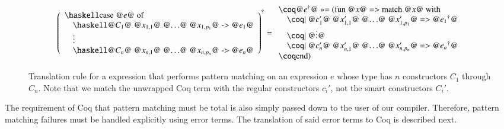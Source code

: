 \begin{figure}[H]
  \[
    \toCoq{\left(
      \begin{array}{l}
        \haskellM{case @$e$@ of}                                                \\
        \quad\haskellM{@$C_1$@ @$x_{1,1}$@ @$\ldots$@ @$x_{1,p_1}$@ -> @$e_1$@} \\
        \quad\vdots                                                             \\
        \quad\haskellM{@$C_n$@ @$x_{n,1}$@ @$\ldots$@ @$x_{n,p_n}$@ -> @$e_n$@}
      \end{array}
    \right)}
    = \begin{array}{l}
      \coqM{@$\toCoqX{e}$@ >>= (fun @$x$@ => match @$x$@ with}                          \\
      \quad\coqM{| @$c_1'$@ @$x_{1,1}'$@ @$\ldots$@ @$x_{1,p_1}'$@ => @$\toCoqX{e_1}$@} \\
      \quad\coqM{| @$\vdots$@}                                                          \\
      \quad\coqM{| @$c_n'$@ @$x_{n,1}'$@ @$\ldots$@ @$x_{n,p_n}'$@ => @$\toCoqX{e_n}$@} \\
      \coqM{end)}
    \end{array}
  \]
  \caption{Translation rule for a  expression that performs pattern matching on an expression $e$ whose type has $n$ constructors $C_1$ through $C_n$. Note that we match the unwrapped Coq term with the regular constructors $c_i'$, not the smart constructors $C_i'$.}
  \label{fig:translation:expr:case}
\end{figure}

The requirement of Coq that pattern matching must be total is also simply passed down to the user of our compiler.
Therefore, pattern matching failures must be handled explicitly using error terms.
The translation of said error terms to Coq is described next.

